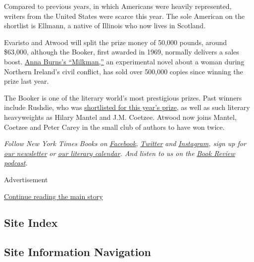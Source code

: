 Compared to previous years, in which Americans were heavily represented,
writers from the United States were scarce this year. The sole American
on the shortlist is Ellmann, a native of Illinois who now lives in
Scotland.

Evaristo and Atwood will split the prize money of 50,000 pounds, around
\$63,000, although the Booker, first awarded in 1969, normally delivers
a sales boost.
\href{https://www.nytimes3xbfgragh.onion/2018/11/29/books/anna-burns-interview-booker-prize-milkman-no-bones.html?searchResultPosition=5}{Anna
Burns's ``Milkman,''} an experimental novel about a woman during
Northern Ireland's civil conflict, has sold over 500,000 copies since
winning the prize last year.

The Booker is one of the literary world's most prestigious prizes. Past
winners include Rushdie, who was
\href{https://www.nytimes3xbfgragh.onion/2019/09/03/books/booker-prize-shortlist.html}{shortlisted
for this year's prize}, as well as such literary heavyweights as Hilary
Mantel and J.M. Coetzee. Atwood now joins Mantel, Coetzee and Peter
Carey in the small club of authors to have won twice.

\emph{Follow New York Times Books on}
\href{https://www.facebookcorewwwi.onion/nytbooks/}{\emph{Facebook}}\emph{,}
\href{https://twitter.com/nytimesbooks}{\emph{Twitter}} \emph{and}
\href{https://www.instagram.com/nytbooks/}{\emph{Instagram}}\emph{, sign
up for}
\href{https://www.nytimes3xbfgragh.onion/newsletters/books-review}{\emph{our
newsletter}} \emph{or}
\href{https://www.nytimes3xbfgragh.onion/interactive/2017/books/books-calendar.html}{\emph{our
literary calendar}}\emph{. And listen to us on the}
\href{https://www.nytimes3xbfgragh.onion/column/book-review-podcast}{\emph{Book
Review podcast}}\emph{.}

Advertisement

\protect\hyperlink{after-bottom}{Continue reading the main story}

\hypertarget{site-index}{%
\subsection{Site Index}\label{site-index}}

\hypertarget{site-information-navigation}{%
\subsection{Site Information
Navigation}\label{site-information-navigation}}

